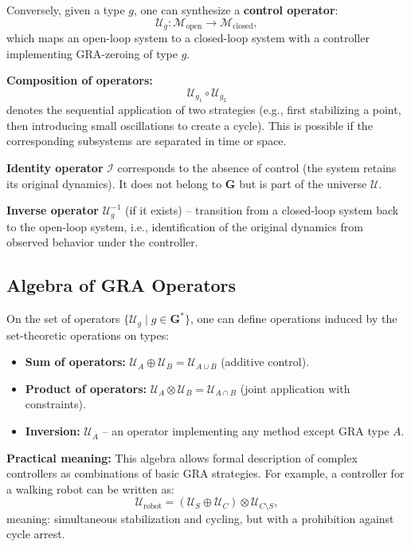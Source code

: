 \documentclass[12pt,a4paper]{article}
\newcommand{\G}{\mathbf{G}}
\newcommand{\U}{\mathcal{U}}
\newcommand{\M}{\mathcal{M}}
\newcommand{\I}{\mathcal{I}}
\begin{document}
Conversely, given a type $g$, one can synthesize a \textbf{control operator}:
\begin{equation}
    \U_g : \M_{\text{open}} \to \M_{\text{closed}},
\end{equation}
which maps an open-loop system to a closed-loop system with a controller implementing GRA-zeroing of type $g$.

\textbf{Composition of operators:}
\begin{equation}
    \U_{g_1} \circ \U_{g_2}
\end{equation}
denotes the sequential application of two strategies (e.g., first stabilizing a point, then introducing small oscillations to create a cycle). This is possible if the corresponding subsystems are separated in time or space.

\textbf{Identity operator} $\I$ corresponds to the absence of control (the system retains its original dynamics). It does not belong to $\G$ but is part of the universe $\U$.

\textbf{Inverse operator} $\U_g^{-1}$ (if it exists) – transition from a closed-loop system back to the open-loop system, i.e., identification of the original dynamics from observed behavior under the controller.

\subsection{Algebra of GRA Operators}

On the set of operators $\{\U_g \mid g \in \G^*\}$, one can define operations induced by the set-theoretic operations on types:

\begin{itemize}
    \item \textbf{Sum of operators:} $\U_A \oplus \U_B = \U_{A \cup B}$ (additive control).
    \item \textbf{Product of operators:} $\U_A \otimes \U_B = \U_{A \cap B}$ (joint application with constraints).
    \item \textbf{Inversion:} $\U_{\overline{A}}$ – an operator implementing any method except GRA type $A$.
\end{itemize}

\textbf{Practical meaning:} This algebra allows formal description of complex controllers as combinations of basic GRA strategies. For example, a controller for a walking robot can be written as:
\begin{equation}
    \U_{\text{robot}} = (\U_S \oplus \U_C) \otimes \U_{C \setminus S},
\end{equation}
meaning: simultaneous stabilization and cycling, but with a prohibition against cycle arrest.
\end{document}
